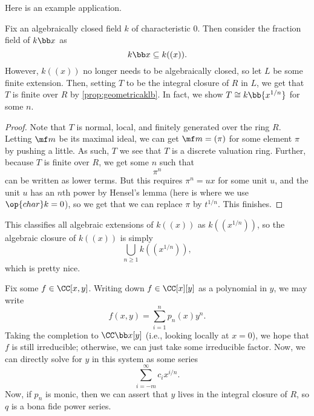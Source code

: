 \documentclass[../notes.tex]{subfiles}
\begin{document}
Here is an example application.
\begin{exe}
	Fix an algebraically closed field $k$ of characteristic $0$. Then consider the fraction field of $k\bb x$ as
	\[k\bb x\subseteq k((x)).\]
	However, $k((x))$ no longer needs to be algebraically closed, so let $L$ be some finite extension. Then, setting $T$ to be the integral closure of $R$ in $L$, we get that $T$ is finite over $R$ by \autoref{prop:geometricaklb}. In fact, we show $T\cong k\bb{x^{1/n}}$ for some $n$.
\end{exe}
\begin{proof}
	Note that $T$ is normal, local, and finitely generated over the ring $R$. Letting $\mf m$ be its maximal ideal, we can get $\mf m=(\pi)$ for some element $\pi$ by pushing a little. As such, $T$ we see that $T$ is a discrete valuation ring. Further, because $T$ is finite over $R$, we get some $n$ such that
	\[\pi^n\]
	can be written as lower terms. But this requires $\pi^n=ux$ for some unit $u$, and the unit $u$ has an $n$th power by Hensel's lemma (here is where we use $\op{char}k=0$), so we get that we can replace $\pi$ by $t^{1/n}$. This finishes.
\end{proof}
\begin{remark}
	This classifies all algebraic extensions of $k((x))$ as $k((x^{1/n}))$, so the algebraic closure of $k((x))$ is simply
	\[\bigcup_{n\ge1}k((x^{1/n})),\]
	which is pretty nice.
\end{remark}
\begin{example}
	Fix some $f\in\CC[x,y]$. Writing down $f\in\CC[x][y]$ as a polynomial in $y$, we may write
	\[f(x,y)=\sum_{i=1}^np_n(x)y^n.\]
	Taking the completion to $\CC\bb x[y]$ (i.e., looking locally at $x=0$), we hope that $f$ is still irreducible; otherwise, we can just take some irreducible factor. Now, we can directly solve for $y$ in this system as some series
	\[\sum_{i=-m}^\infty c_ix^{i/n}.\]
	Now, if $p_n$ is monic, then we can assert that $y$ lives in the integral closure of $R$, so $q$ is a bona fide power series.
\end{example}
\end{document}

